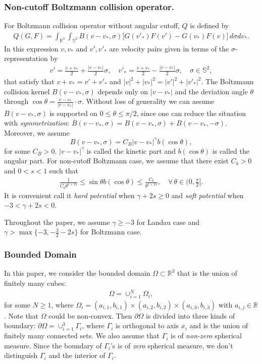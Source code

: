 \documentclass[reqno,a4paper]{amsart}
\numberwithin{equation}{section}
\newcommand{\1}{\mathbf{1}}
\newcommand{\R}{\mathbb{R}}
\newcommand{\pa}{\partial}
\newcommand{\<}{\langle}
\renewcommand{\>}{\rangle}
\begin{document}
\subsubsection{Non-cutoff Boltzmann collision operator.} For Boltzmann collision operator without angular cutoff, $Q$ is defined by 	
	\begin{align*}
		Q(G,F) = \int_{\R^3}\int_{\mathbb{S}^{2}} B(v-v_*,\sigma)\big[G(v'_*)F(v')-G(v_*)F(v)\big]\,d\sigma dv_*.
	\end{align*}  
	In this expression $v,v_*$ and $v',v'_*$ are velocity pairs given in terms of the $\sigma$-representation by 
	\begin{align*}
		v'=\frac{v+v_*}{2}+\frac{|v-v_*|}{2}\sigma,\quad v'_*=\frac{v+v_*}{2}-\frac{|v-v_*|}{2}\sigma,\quad \sigma\in\mathbb{S}^2,
	\end{align*}
	that satisfy that 
	$v+v_*=v'+v'_*$ and 
	$|v|^2+|v_*|^2=|v'|^2+|v'_*|^2$.
	The Boltzmann collision kernel $B(v-v_*,\sigma)$ depends only on $|v-v_*|$ and the deviation angle $\theta$ through $\cos\theta=\frac{v-v_*}{|v-v_*|}\cdot\sigma$. Without loss of generality we can assume $B(v-v_*,\sigma)$ is supported on $0\le\theta\le\pi/2$, since one can reduce the situation with {\it symmetrization}: $\overline{B}(v-v_*,\sigma)={B}(v-v_*,\sigma)+{B}(v-v_*,-\sigma)$. Moreover, we assume 
	\begin{equation*}
		B(v-v_*,\sigma) = C_B|v-v_*|^\gamma b(\cos\theta),
	\end{equation*}
	for some $C_B>0$. $|v-v_*|^\gamma$ is called the kinetic part and $b(\cos\theta)$ is called the angular part. For non-cutoff Boltzmann case, we assume that there exist $C_b>0$ and $0<s<1$ such that  
	\begin{align*}
		\frac{1}{C_b\theta^{1+2s}}\le \sin\theta b(\cos\theta)\le \frac{C_b}{\theta^{1+2s}}, \quad\forall\,\theta\in (0,\frac{\pi}{2}].
	\end{align*} 
It is convenient call it {\em hard potential} when $\gamma+2s\ge 0$ and {\em soft potential} when $-3<\gamma+2s<0$. 

Throughout the paper, we assume $\gamma\ge -3$ for Landau case and $\gamma>\max\{-3,-\frac{3}{2}-2s\}$ for Boltzmann case. 
	
\subsubsection{Bounded Domain}	


In this paper, we consider the bounded domain $\Omega\subset \R^3$ that is the union of finitely many cubes: 
\begin{align*}
	\Omega=\cup_{i=1}^N\Omega_i,
\end{align*} for some $N\ge 1$, where $\Omega_i = (a_{i,1},b_{i,1})\times(a_{i,2},b_{i,2})\times(a_{i,3},b_{i,3})$ with $a_{i,j}\in\R$. Note that $\Omega$ could be non-convex. Then
$\partial\Omega$ is divided into three kinds of boundary: $\pa\Omega=\cup^3_{i=1}\Gamma_i$, where $\Gamma_i$ is orthogonal to axis $x_i$ and is the union of finitely many connected sets. We also assume that $\Gamma_i$ is of {\em non-zero} spherical measure.  
Since the boundary of $\Gamma_i$'s is of {\em zero} spherical measure, we don't distinguish $\Gamma_i$ and the interior of $\Gamma_i$. 
\end{document}
